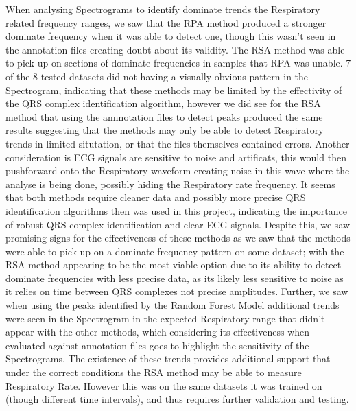 When analysing Spectrograms to identify dominate trends the Respiratory related frequency ranges, we saw that the RPA method produced a stronger dominate frequency when it was able to detect one,
though this wasn't seen in the annotation files creating doubt about its validity. The RSA method was able to 
 pick up on sections of dominate frequencies in samples that RPA was unable. 7 of the 8 tested datasets did not having a visually obvious pattern 
in the Spectrogram, indicating that these methods may be limited by  the effectivity of the 
QRS complex identification algorithm, however we did see for the RSA method that using the annnotation files 
to detect peaks produced the same results suggesting that the methods may only be able to detect Respiratory trends 
in limited situtation, or that the files themselves contained errors. Another consideration is ECG signals are sensitive to noise 
and artificats, this would then pushforward 
onto the Respiratory waveform creating noise in this wave where the analyse is being done,  possibly 
hiding the Respiratory rate frequency. It seems that both methods require cleaner data and possibly more precise QRS identification algorithms 
then was used in this project, indicating the importance of 
robust QRS complex identification and clear ECG signals. 
 Despite this, we saw promising signs for the effectiveness
of these methods as we saw that the methods were able to pick up on a dominate frequency pattern on some dataset; with the RSA method appearing to be the most viable option due to its ability to detect dominate 
frequencies with less precise data, as its likely less sensitive to noise as it relies on time between 
QRS complexes not precise amplitudes. Further, we saw when using the peaks identified by the Random Forest Model additional 
trends were seen in the Spectrogram in the expected Respiratory range that didn't appear with the other methods, which considering 
its effectiveness when evaluated against annotation files goes to highlight the sensitivity of the Spectrograms.
The existence of these trends provides additional 
support that under the correct conditions the RSA method may be able to measure Respiratory Rate. However this was on 
the same datasets it was trained on (though different time intervals), and thus requires further validation and testing. 


